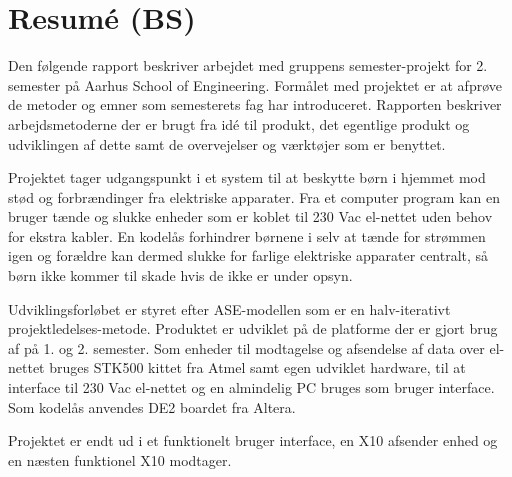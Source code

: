\chapter*{Resumé (BS)}

Den følgende rapport beskriver arbejdet med gruppens semester-projekt for 2. semester på Aarhus School of Engineering. Formålet med projektet er at afprøve de metoder og emner som semesterets fag har introduceret. Rapporten beskriver arbejdsmetoderne der er brugt fra idé til produkt, det egentlige produkt og udviklingen af dette samt de overvejelser og værktøjer som er benyttet.

Projektet tager udgangspunkt i et system til at beskytte børn i hjemmet mod stød og forbrændinger fra elektriske apparater. Fra et computer program kan en bruger tænde og slukke enheder som er koblet til 230 Vac el-nettet uden behov for ekstra kabler. En kodelås forhindrer børnene i selv at tænde for strømmen igen og forældre kan dermed slukke for farlige elektriske apparater centralt, så børn ikke kommer til skade hvis de ikke er under opsyn. 

Udviklingsforløbet er styret efter ASE-modellen som er en halv-iterativt projektledelses-metode. Produktet er udviklet på de platforme der er gjort brug af på 1. og 2. semester. Som enheder til modtagelse og afsendelse af data over el-nettet bruges STK500 kittet fra Atmel samt egen udviklet hardware, til at interface til 230 Vac el-nettet og en almindelig PC bruges som bruger interface. Som kodelås anvendes DE2 boardet fra Altera.

Projektet er endt ud i et funktionelt bruger interface, en X10 afsender enhed og en næsten funktionel X10 modtager.
